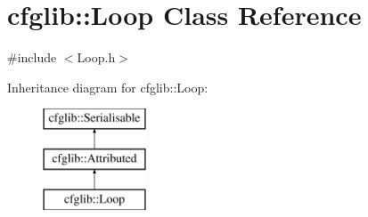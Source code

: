 \hypertarget{classcfglib_1_1Loop}{}\section{cfglib\+:\+:Loop Class Reference}
\label{classcfglib_1_1Loop}


{\ttfamily \#include $<$Loop.\+h$>$}

Inheritance diagram for cfglib\+:\+:Loop\+:\begin{figure}[H]
\begin{center}
\leavevmode
\includegraphics[height=3.000000cm]{classcfglib_1_1Loop}
\end{center}
\end{figure}
